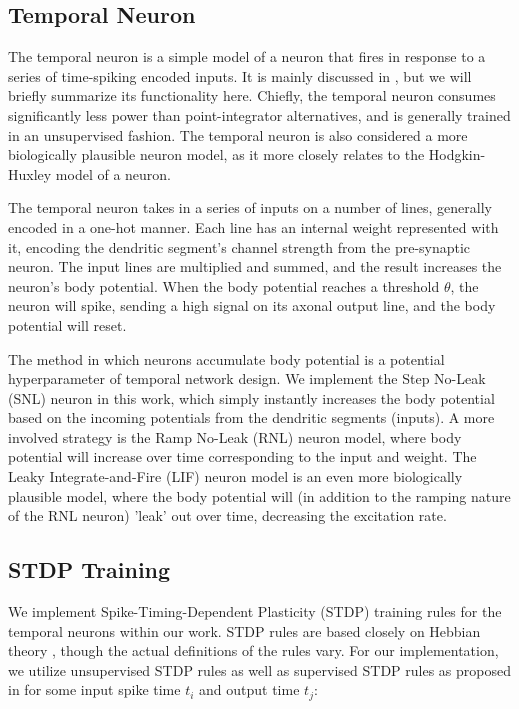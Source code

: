 \subsection{Temporal Neuron} \label{sec:Temporal Neuron}

The temporal neuron is a simple model of a neuron that fires in response to a
series of time-spiking encoded inputs. It is mainly discussed in \cite{TNN}, but
we will briefly summarize its functionality here. Chiefly, the temporal neuron
consumes significantly less power than point-integrator alternatives, and is
generally trained in an unsupervised fashion. The temporal neuron is also
considered a more biologically plausible neuron model, as it more closely
relates to the Hodgkin-Huxley model \cite{Hodgkin-Huxley} of a neuron.

The temporal neuron takes in a series of inputs on a number of lines, generally
encoded in a one-hot manner. Each line has an internal weight represented with
it, encoding the dendritic segment's channel strength from the pre-synaptic
neuron. The input lines are multiplied and summed, and the result increases the
neuron's body potential. When the body potential reaches a threshold $\theta$,
the neuron will spike, sending a high signal on its axonal output line, and the
body potential will reset.

The method in which neurons accumulate body potential is a potential
hyperparameter of temporal network design. We implement the Step No-Leak (SNL)
neuron in this work, which simply instantly increases the body potential based
on the incoming potentials from the dendritic segments (inputs). A more involved
strategy is the Ramp No-Leak (RNL) neuron model, where body potential will
increase over time corresponding to the input and weight. The Leaky
Integrate-and-Fire (LIF) neuron model is an even more biologically plausible
model, where the body potential will (in addition to the ramping nature of the
RNL neuron) 'leak' out over time, decreasing the excitation rate.

\subsection{STDP Training}

We implement Spike-Timing-Dependent Plasticity (STDP) training rules for the
temporal neurons within our work. STDP rules are based closely on Hebbian theory
\cite{STDP}, though the actual definitions of the rules vary. For our
implementation, we utilize unsupervised STDP rules as well as supervised STDP
rules as proposed in \cite{TNN} for some input spike time $t_i$ and output time
$t_j$:

